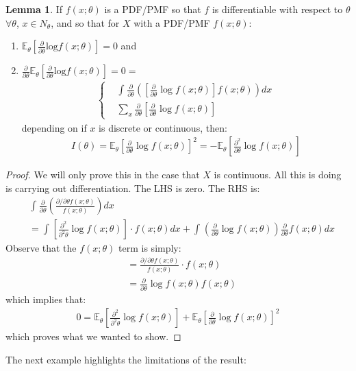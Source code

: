 \documentclass[11pt]{scrartcl}
\theoremstyle{definition}
\newtheorem{lemma}[theorem]{Lemma}
\theoremstyle{remark}
\newcommand{\EXth}[1]{\mathbb{E}_\theta \left[ #1 \right]}
\newcommand{\idx}[2]{\int_{#1}^{#2}}
\begin{document}
{\begin{lemma}
	If $f(x; \theta)$ is a PDF/PMF so that $f$ is differentiable with respect to $\theta$ $\forall \theta$, $x \in N_\theta$, and so that for $X$ with a PDF/PMF $f(x; \theta)$: 
	\begin{enumerate}[noitemsep]
		\item $\EXth{\frac{\partial}{\partial \theta} \text{log}f(x; \theta)} =0$ and 
		\item $\frac{\partial}{\partial \theta} \EXth{\frac{\partial}{\partial \theta} \text{log}f(x; \theta) } = 0 = $ 
		\begin{align*}
			\begin{cases}
				& \idx{}{} \frac{\partial}{\partial \theta} \left( \left[  \frac{\partial}{\partial \theta} \log f(x; \theta)   \right]	f(x; \theta) 	\right) dx \\
				& \sum_{x} \frac{\partial}{\partial \theta} \left[ \frac{\partial}{\partial \theta} \log f(x; \theta) \right] 
			\end{cases}	
		\end{align*}
			depending on if $x$ is discrete or continuous, then: 
			\begin{align*}
				I(\theta) = \EXth{\frac{\partial}{\partial \theta} \log f(x; \theta)}^2	= - \EXth{\frac{\partial^2}{\partial \theta} \log f(x; \theta)}
			\end{align*}
	\end{enumerate}
\end{lemma}

\begin{proof}
	We will only prove this in the case that $X$ is continuous. All this is doing is carrying out differentiation. The LHS is zero. The RHS is: 
	\begin{align*}
		& \idx{}{} \frac{\partial}{\partial \theta} \left( 	\frac{\partial / \partial \theta f(x; \theta) }{f(x; \theta)}		\right) dx  	\\
		& = \idx{}{} \left[ 	\frac{\partial^2}{\partial^2 \theta}	 \log f(x; \theta)	\right] \cdot f(x; \theta) dx + \idx{}{}  \left( \frac{\partial}{\partial \theta} \log f(x; \theta) \right) \frac{\partial}{\partial \theta} f(x; \theta) dx 
	\end{align*}
	Observe that the $f(x; \theta)$ term is simply: 
	\begin{align*}
		& = \frac{\partial / \partial \theta f(x; \theta)}{f(x; \theta)} \cdot f(x; \theta) \\
		& = \frac{\partial}{\partial \theta} \log f(x; \theta) f(x; \theta) 
	\end{align*}
	which implies that: 
	\begin{align*}
		0 = \EXth{\frac{\partial^2}{\partial^2 \theta} \log f(x; \theta)} + \EXth{\frac{\partial}{\partial \theta} \log f(x; \theta)}^2 
	\end{align*}
	which proves what we wanted to show. 
\end{proof}
The next example highlights the limitations of the result: 

}
\end{document}
